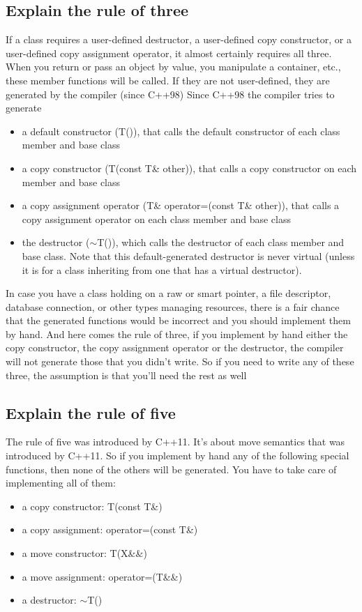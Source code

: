 \documentclass{report}
\begin{document}
\pagebreak 
{}
\bigbreak \noindent 
\subsection{Explain the rule of three}
\bigbreak \noindent 
If a class requires a user-defined destructor, a user-defined copy constructor, or a user-defined copy assignment operator, it almost certainly requires all three.
\bigbreak \noindent 
When you return or pass an object by value, you manipulate a container, etc., these member functions will be called. If they are not user-defined, they are generated by the compiler (since C++98)
\bigbreak \noindent 
Since C++98 the compiler tries to generate
\begin{itemize}
    \item a default constructor (T()), that calls the default constructor of each class member and base class
    \item a copy constructor (T(const T\& other)), that calls a copy constructor on each member and base class
    \item a copy assignment operator (T\& operator=(const T\& other)), that calls a copy assignment operator on each class member and base class
    \item the destructor ($\sim$T()), which calls the destructor of each class member and base class. Note that this default-generated destructor is never virtual (unless it is for a class inheriting from one that has a virtual destructor).
\end{itemize}
\bigbreak \noindent 
In case you have a class holding on a raw or smart pointer,
a file descriptor, database connection, or other types managing
resources, there is a fair chance that the generated functions would
be incorrect and you should implement them by hand.
\bigbreak \noindent 
And here comes the rule of three, if you implement by hand
either the copy constructor, the copy assignment operator or the
destructor, the compiler will not generate those that you didn’t
write. So if you need to write any of these three, the assumption
is that you’ll need the rest as well
\bigbreak \noindent 
\subsection{Explain the rule of five}
\bigbreak \noindent 
 The rule of five was introduced by C++11. It’s about move semantics that was introduced by C++11. So if you
implement by hand any of the following special functions, then
none of the others will be generated. You have to take care of
implementing all of them:
\begin{itemize}
    \item a copy constructor: T(const T\&)
    \item a copy assignment: operator=(const T\&)
    \item a move constructor: T(X\&\&)
    \item a move assignment: operator=(T\&\&)
    \item a destructor: $\sim$T()
\end{itemize}
\end{document}
